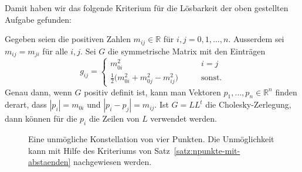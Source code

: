 Damit haben wir das folgende Kriterium für die Lösbarkeit der oben
gestellten Aufgabe gefunden:

\begin{satz}
\label{satz:npunkte-mit-abstaenden}
Gegeben seien die positiven Zahlen $m_{ij}\in\mathbb R$ für
$i,j=0,1,\dots,n$.
Ausserdem sei $m_{ij}=m_{ji}$ für alle $i,j$.
Sei $G$ die symmetrische Matrix mit den Einträgen
\[
g_{ij}
=
\begin{cases}
m_{0i}^2&\qquad i=j\\
\displaystyle
\frac12
\bigl(
m_{0i}^2+m_{0j}^2-m_{ij}^2
\bigr)
&\qquad \text{sonst.}
\end{cases}
\]
Genau dann, wenn $G$ positiv definit ist, kann man Vektoren
$p_1,\dots,p_n\in \mathbb R^n$ finden derart, dass $|p_i|=m_{0i}$ und
$|p_i-p_j|=m_{ij}$.
Ist $G=LL^t$ die Cholesky-Zerlegung, dann können für die $p_i$ die Zeilen
von $L$ verwendet werden.
\end{satz}

\begin{figure}
\centering
{}
\caption{Eine unmögliche Konstellation von vier Punkten.
Die Unmöglichkeit kann mit Hilfe des Kriteriums von
Satz~\ref{satz:npunkte-mit-abstaenden} nachgewiesen werden.
\label{fig:4punkte-mit-abstaenden}}
\end{figure}


